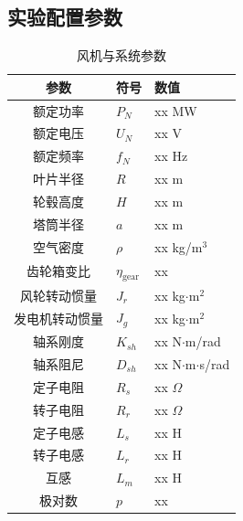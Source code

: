 \documentclass[withoutpreface,bwprint]{cumcmthesis}
\begin{document}
\begin{appendices}
\section{实验配置参数}
\begin{table}[!ht]
\centering
\caption{风机与系统参数}
\label{app:params}
\begin{tabular}{cll}
\toprule
\textbf{参数} & \textbf{符号} & \textbf{数值} \\
\midrule
额定功率 & $P_N$ & xx MW \\
额定电压 & $U_N$ & xx V \\
额定频率 & $f_N$ & xx Hz \\
叶片半径 & $R$ & xx m \\
轮毂高度 & $H$ & xx m \\
塔筒半径 & $a$ & xx m \\
空气密度 & $\rho$ & xx kg/m$^3$ \\
齿轮箱变比 & $\eta_{\mathrm{gear}}$ & xx \\
风轮转动惯量 & $J_r$ & xx kg$\cdot$m$^2$ \\
发电机转动惯量 & $J_g$ & xx kg$\cdot$m$^2$ \\
轴系刚度 & $K_{sh}$ & xx N$\cdot$m/rad \\
轴系阻尼 & $D_{sh}$ & xx N$\cdot$m$\cdot$s/rad \\
定子电阻 & $R_s$ & xx $\Omega$ \\
转子电阻 & $R_r$ & xx $\Omega$ \\
定子电感 & $L_s$ & xx H \\
转子电感 & $L_r$ & xx H \\
互感 & $L_m$ & xx H \\
极对数 & $p$ & xx \\
\bottomrule
\end{tabular}
\end{table}

\end{appendices}
\end{document}
